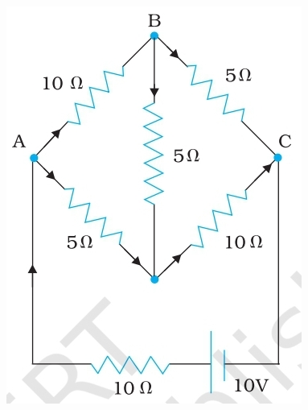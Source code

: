 \begin{enumerate}[label=\thesubsection.\arabic*.,ref=\thesubsection.\theenumi]
\begin{figure}[H]
    \includegraphics[width=\columnwidth]{figs/ckts/ckt4.jpg} %
    \caption{} 
    \label{fig:ckt4} 
\end{figure}
\end{enumerate}
 

